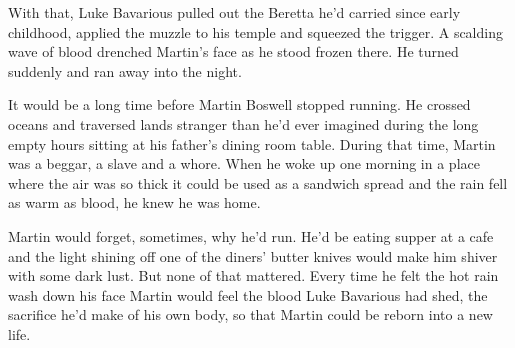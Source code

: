 With that, Luke Bavarious pulled out the Beretta he'd carried since
early childhood, applied the muzzle to his temple and squeezed the
trigger. A scalding wave of blood drenched Martin's face as he
stood frozen there. He turned suddenly and ran away into the
night.



It would be a long time before Martin Boswell stopped running. He
crossed oceans and traversed lands stranger than he'd ever imagined
during the long empty hours sitting at his father's dining room
table. During that time, Martin was a beggar, a slave and a whore.
When he woke up one morning in a place where the air was so thick
it could be used as a sandwich spread and the rain fell as warm as
blood, he knew he was home.



Martin would forget, sometimes, why he'd run. He'd be eating supper
at a cafe and the light shining off one of the diners' butter
knives would make him shiver with some dark lust. But none of that
mattered. Every time he felt the hot rain wash down his face Martin
would feel the blood Luke Bavarious had shed, the sacrifice he'd
make of his own body, so that Martin could be reborn into a new
life. 
 





